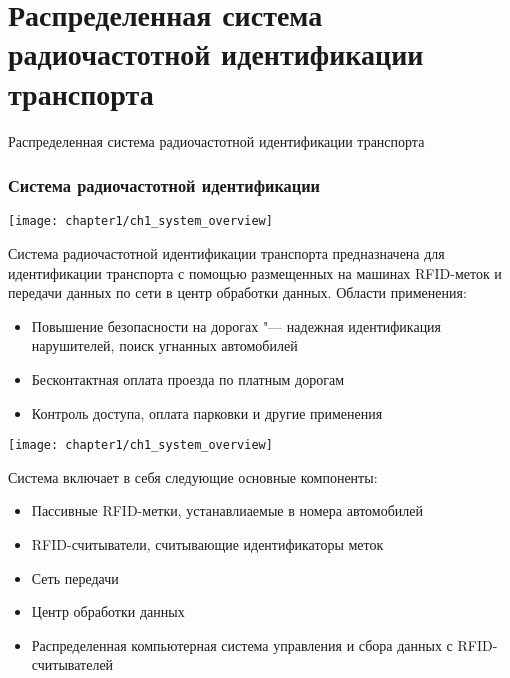 \section{Распределенная система радиочастотной идентификации транспорта}
\begin{frame}
    \begin{center}
        \Huge
        Распределенная система радиочастотной идентификации транспорта
    \end{center}
\end{frame}

\begin{frame}[allowframebreaks]
    \frametitle{Система радиочастотной идентификации}
    \begin{center}
        \texttt{[image: chapter1/ch1\_system\_overview]}
    \end{center}
    Система радиочастотной идентификации транспорта предназначена для
    идентификации транспорта с помощью размещенных на машинах RFID-меток
    и передачи данных по сети в центр обработки данных. Области применения:
    \begin{itemize}
        \item Повышение безопасности на дорогах "--- надежная идентификация нарушителей, поиск угнанных автомобилей
        \item Бесконтактная оплата проезда по платным дорогам
        \item Контроль доступа, оплата парковки и другие применения
    \end{itemize}
    \vfill
    \framebreak
    \begin{center}
        \texttt{[image: chapter1/ch1\_system\_overview]}
    \end{center}
    Система включает в себя следующие основные компоненты:
    \begin{itemize}
        \item Пассивные RFID-метки, устанавлиаемые в номера автомобилей
        \item RFID-считыватели, считывающие идентификаторы меток
        \item Сеть передачи
        \item Центр обработки данных
        \item Распределенная компьютерная система управления и сбора данных с RFID-считывателей
    \end{itemize}
\end{frame}

